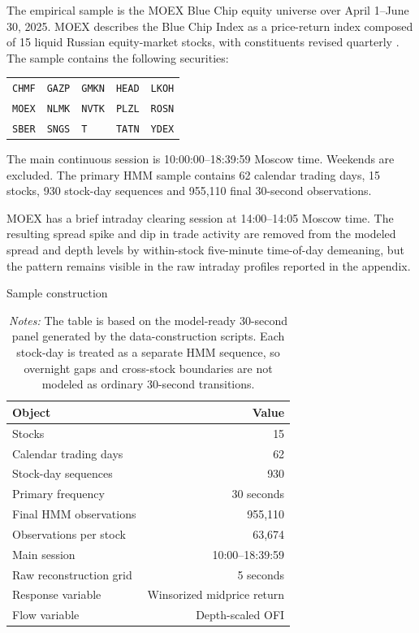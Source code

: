 \documentclass[12pt,a4paper]{article}
\begin{document}
The empirical sample is the MOEX Blue Chip equity universe over April 1--June 30, 2025. MOEX describes the Blue Chip Index as a price-return index composed of 15 liquid Russian equity-market stocks, with constituents revised quarterly \citep{MOEXBlueChip}. The sample contains the following securities:
\begin{center}
\small\setlength{\tabcolsep}{12pt}
\begin{tabular}{lllll}
\texttt{CHMF} & \texttt{GAZP} & \texttt{GMKN} & \texttt{HEAD} & \texttt{LKOH} \\
\texttt{MOEX} & \texttt{NLMK} & \texttt{NVTK} & \texttt{PLZL} & \texttt{ROSN} \\
\texttt{SBER} & \texttt{SNGS} & \texttt{T} & \texttt{TATN} & \texttt{YDEX}
\end{tabular}
\end{center}
The main continuous session is 10:00:00--18:39:59 Moscow time. Weekends are excluded. The primary HMM sample contains 62 calendar trading days, 15 stocks, 930 stock-day sequences  and 955,110 final 30-second observations.

MOEX has a brief intraday clearing session at 14:00--14:05 Moscow time. The resulting spread spike and dip in trade activity are removed from the modeled spread and depth levels by within-stock five-minute time-of-day demeaning, but the pattern remains visible in the raw intraday profiles reported in the appendix.

\begin{table}[!htbp]
\centering
\caption{Sample construction}
\small
\begin{tabular}{L{0.45\textwidth}r}
\toprule
\textbf{Object} & \textbf{Value} \\
\midrule
Stocks & 15 \\
Calendar trading days & 62 \\
Stock-day sequences & 930 \\
Primary frequency & 30 seconds \\
Final HMM observations & 955,110 \\
Observations per stock & 63,674 \\
Main session & 10:00--18:39:59 \\
Raw reconstruction grid & 5 seconds \\
Response variable & Winsorized midprice return \\
Flow variable & Depth-scaled OFI \\
\bottomrule
\end{tabular}
\caption*{\footnotesize\emph{Notes:} The table is based on the model-ready 30-second panel generated by the data-construction scripts. Each stock-day is treated as a separate HMM sequence, so overnight gaps and cross-stock boundaries are not modeled as ordinary 30-second transitions.}
\label{tab:sample}
\end{table}
\end{document}
